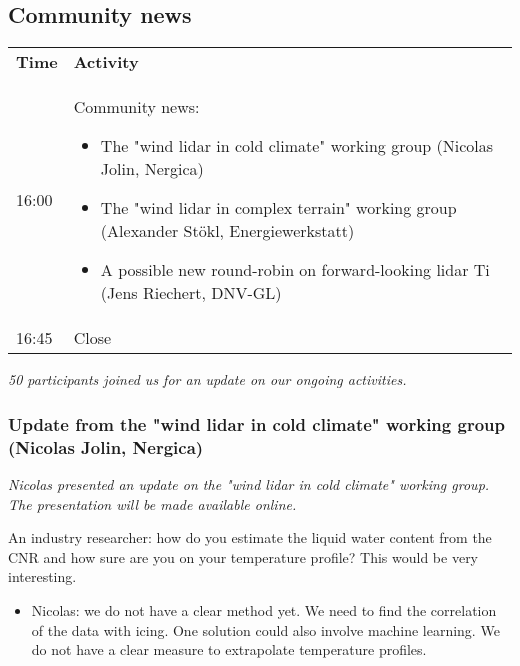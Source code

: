 \subsection{Community news}

\begin{table}[!h]
  \centering
  \begin{tabular}{@{}|p{}|p{}|@{}}
  \rowcolor{Task32Blue2} \textbf{Time} & \textbf{Activity} \\  
  16:00 & Community news:
    \begin{itemize}
      \item The "wind lidar in cold climate" working group (Nicolas Jolin, Nergica)
      \item The "wind lidar in complex terrain" working group (Alexander Stökl, Energiewerkstatt)
      \item A possible new round-robin on forward-looking lidar Ti (Jens Riechert, DNV-GL)
    \end{itemize}\\
  16:45 & Close \\
  \end{tabular}
  \label{tab:day2-community-news-agenda}
\end{table}

\emph{50 participants joined us for an update on our ongoing
activities.}

\subsubsection[Update from the "wind lidar in cold climate" working
group]{Update from the "wind lidar in cold climate" working
group (Nicolas Jolin, Nergica)}

\emph{Nicolas presented an update on the "wind lidar in cold climate"
working group. The presentation will be made available online.}

An industry researcher: how do you estimate the liquid water content
from the CNR and how sure are you on your temperature profile? This
would be very interesting.

\begin{itemize}
\item Nicolas: we do not have a clear method yet. We need to find the
  correlation of the data with icing. One solution could also involve
  machine learning. We do not have a clear measure to extrapolate
  temperature profiles.
\end{itemize}

